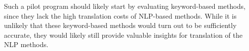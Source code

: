 \documentclass[english]{tktltiki2}
\theoremstyle{definition}
\theoremstyle{remark}
\begin{document}
Such a pilot program should likely start by evaluating keyword-based methods, since they lack the high translation costs of NLP-based methods. While it is unlikely that these keyword-based methods would turn out to be sufficiently accurate, they would likely still provide valuable insights for translation of the NLP methods.









\end{document}
